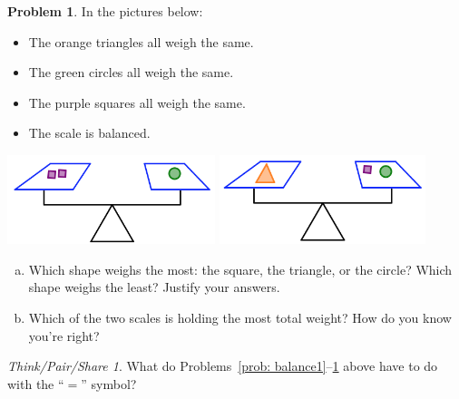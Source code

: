\documentclass[12pt, reqno]{amsart}
\theoremstyle{remark}
\newtheorem*{thinkpair*}{Think/Pair/Share}
\theoremstyle{definition}
\newtheorem{problem}{Problem}
\numberwithin{equation}{section}  %
\begin{document}
\bigskip


\begin{problem}\label{prob: balance4}
In the pictures below:
\begin{itemize}
\item
The orange triangles all weigh the same.  
\item
The green circles all weigh the same.  
\item
The purple squares all weigh the same.  
\item
The scale is balanced.
\end{itemize}

\begin{center}
\includegraphics[height=2.6cm]{balance4a}\quad
\includegraphics[height=2.6cm]{balance4b}

\end{center}

\begin{enumerate}[(a)]
\item
Which shape weighs the most: the square, the triangle, or the circle?  Which shape weighs the least?  Justify your answers.\\
\item
Which of the two scales is holding the most total weight?  How do you know you're right?
\end{enumerate}


\end{problem}





\bigskip
\bigskip

\bigskip

\begin{thinkpair*}
What do Problems~\ref{prob: balance1}--\ref{prob: balance4} above have to do with the ``$=$'' symbol?  
\end{thinkpair*}
\end{document}

